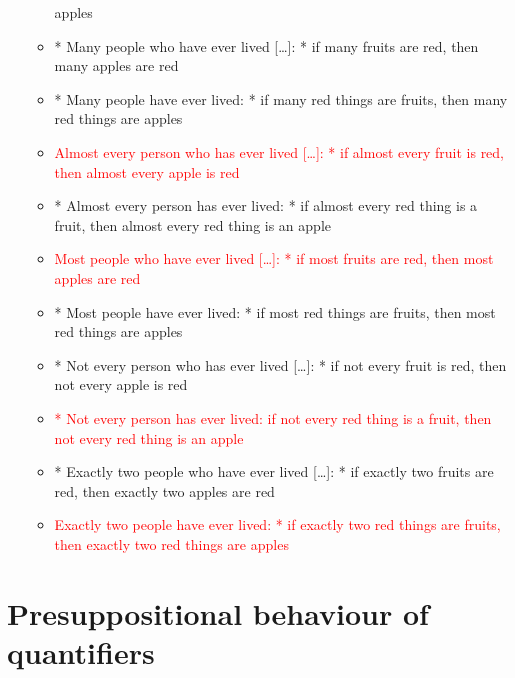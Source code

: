 \documentclass[a4paper]{article}
\begin{document}
\begin{itemize}
\begin{itemize}
    apples
  \item * Many people who have ever lived [\ldots]: * if many fruits are red, then many apples are red
  \item * Many people have ever lived: * if many red things are fruits, then many red things are
    apples
  \item \textcolor{red}{Almost every person who has ever lived [\ldots]: * if almost every fruit is red, then
      almost every apple is red}
  \item * Almost every person has ever lived: * if almost every red thing is a fruit, then almost
    every red thing is an apple
  \item \textcolor{red}{Most people who have ever lived [\ldots]: * if most fruits are red, then most apples are red}
  \item * Most people have ever lived: * if most red things are fruits, then most red things are
    apples
  \item * Not every person who has ever lived [\ldots]: * if not every fruit is red, then not every apple is red
  \item \textcolor{red}{* Not every person has ever lived: if not every red thing is a fruit, then not every
      red thing is an apple}
  \item * Exactly two people who have ever lived [\ldots]: * if exactly two fruits are red, then exactly two
    apples are red
  \item \textcolor{red}{Exactly two people have ever lived: * if exactly two red things are fruits, then exactly two red
    things are apples}
  \end{itemize}
\end{itemize}


\section{Presuppositional behaviour of quantifiers}
\end{document}

